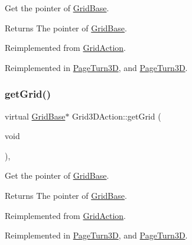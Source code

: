 Get the pointer of \hyperlink{classGridBase}{Grid\+Base}. 

\begin{DoxyReturn}{Returns}
The pointer of \hyperlink{classGridBase}{Grid\+Base}. 
\end{DoxyReturn}


Reimplemented from \hyperlink{classGridAction_abb96dc546ce69541bd233b7c2f240add}{Grid\+Action}.



Reimplemented in \hyperlink{classPageTurn3D_a69c44c157a7652d2a183dba481bce69a}{Page\+Turn3D}, and \hyperlink{classPageTurn3D_a7b3315a39780438de87cbaa2c9c52c9c}{Page\+Turn3D}.

\mbox{\label{classGrid3DAction_a9b03fb743c9ba963d361b87ce975a642}} 
\subsubsection{\texorpdfstring{get\+Grid()}{getGrid()}\hspace{0.1cm}{\footnotesize\ttfamily [2/2]}}
{\footnotesize\ttfamily virtual \hyperlink{classGridBase}{Grid\+Base}$\ast$ Grid3\+D\+Action\+::get\+Grid (\begin{DoxyParamCaption}\item[{void}]{ }\end{DoxyParamCaption})\hspace{0.3cm}{\ttfamily [override]}, {\ttfamily [virtual]}}



Get the pointer of \hyperlink{classGridBase}{Grid\+Base}. 

\begin{DoxyReturn}{Returns}
The pointer of \hyperlink{classGridBase}{Grid\+Base}. 
\end{DoxyReturn}


Reimplemented from \hyperlink{classGridAction_abb96dc546ce69541bd233b7c2f240add}{Grid\+Action}.



Reimplemented in \hyperlink{classPageTurn3D_a69c44c157a7652d2a183dba481bce69a}{Page\+Turn3D}, and \hyperlink{classPageTurn3D_a7b3315a39780438de87cbaa2c9c52c9c}{Page\+Turn3D}.

\mbox{\label{classGrid3DAction_a5e488a9ee6a5605725f01a8a30a55975}} 
